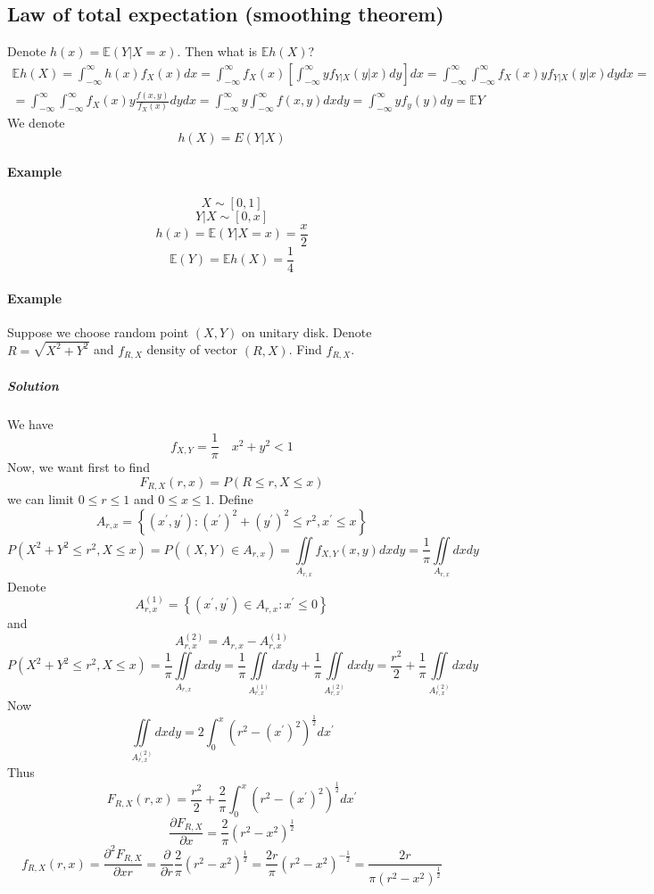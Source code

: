 \subsection{Law of total expectation (smoothing theorem)}
Denote $h(x) = \mathbb{E}(Y|X=x)$. Then what is $\mathbb{E} h(X)$?
\begin{align*}
\mathbb{E} h(X) = \int_{-\infty}^{\infty} h(x) f_X(x) dx = \int_{-\infty}^\infty f_X(x) \left[\int_{-\infty}^\infty yf_{Y|X} (y|x) dy  \right]dx = \int_{-\infty}^\infty\int_{-\infty}^\infty f_X(x) y f_{Y|X} (y|x) dydx =\\= \int_{-\infty}^\infty\int_{-\infty}^\infty f_X(x) y \frac{f(x,y)}{f_X(x)}dydx = \int_{-\infty}^\infty y \int_{-\infty}^\infty  f(x,y)dxdy =  \int_{-\infty}^\infty y  f_y(y) dy = \mathbb{E} Y
\end{align*}
We denote 
$$h(X) = E(Y|X)$$
\paragraph{Example}
$$X \sim [0,1]$$
$$Y|X \sim [0, x]$$
$$h(x) = \mathbb{E}(Y|X=x)=\frac{x}{2}$$
$$\mathbb{E}(Y) = \mathbb{E} h(X) = \frac{1}{4}$$
\paragraph{Example}
Suppose we choose random point $(X,Y)$ on unitary disk.
Denote $R = \sqrt{X^2+Y^2}$ and $f_{R,X}$ density of vector $(R,X)$. Find $f_{R,X}$.
\subparagraph{Solution}
We have
$$f_{X,Y} = \frac{1}{\pi} \quad x^2+y^2 < 1$$
Now, we want first to find
$$F_{R,X} (r,x) = P(R \leq r, X \leq x)$$
we can limit $0\leq r \leq 1$ and $0\leq x \leq 1$.
Define
$$A_{r,x} = \left\{ \left( x^\prime, y^\prime \right): \left(x^\prime\right)^2 + (y^\prime)^2 \leq r^2 , x^\prime \leq x \right\}$$
$$P\left(X^2+Y^2 \leq r^2, X \leq x  \right) = P((X,Y) \in A_{r,x}) = \iint\limits_{A_{r,x}} f_{X,Y} (x,y) dxdy = \frac{1}{\pi} \iint\limits_{A_{r,x}}  dxdy $$
Denote
$$A_{r,x}^{(1)} = \left\{ \left( x^\prime, y^\prime \right)\in A_{r,x} : x^\prime \leq 0 \right\}$$
and
$$A_{r,x}^{(2)} = A_{r,x}-A_{r,x}^{(1)}$$
$$P\left(X^2+Y^2 \leq r^2, X \leq x  \right)  = \frac{1}{\pi} \iint\limits_{A_{r,x}}  dxdy  = \frac{1}{\pi} \iint\limits_{A^{(1)}_{r,x}}  dxdy +\frac{1}{\pi} \iint\limits_{A^{(2)}_{r,x}}  dxdy = \frac{r^2}{2}+\frac{1}{\pi} \iint\limits_{A^{(2)}_{r,x}}  dxdy$$
Now
$$\iint\limits_{A^{(2)}_{r,x}}  dxdy = 2 \int_{0}^{x} (r^2 - (x^\prime)^2) ^{\frac{1}{2}} dx^\prime$$
Thus
$$F_{R,X} (r,x) = \frac{r^2}{2}+ \frac{2}{\pi} \int_{0}^{x} (r^2 - (x^\prime)^2)^{\frac{1}{2}} dx^\prime$$
$$\frac{\partial F_{R,X} }{\partial x} =\frac{2}{\pi}(r^2 - x^2)^{\frac{1}{2}}$$
$$f_{R,X} (r,x) = \frac{\partial^2 F_{R,X} }{\partial xr} = \frac{\partial }{\partial r}  \frac{2}{\pi}(r^2 - x^2)^{\frac{1}{2}}  =\frac{2r}{\pi}(r^2 - x^2)^{-\frac{1}{2}} =\frac{2r}{\pi(r^2 - x^2)^{\frac{1}{2}} }$$


